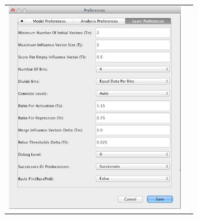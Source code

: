 \documentclass[titlepage,11pt]{article}
\begin{document}
\begin{center}
\begin{tabular}{cc}
\includegraphics[height=90mm]{screenshots/LearnPref}
\end{tabular}
\end{center}



\end{document}
